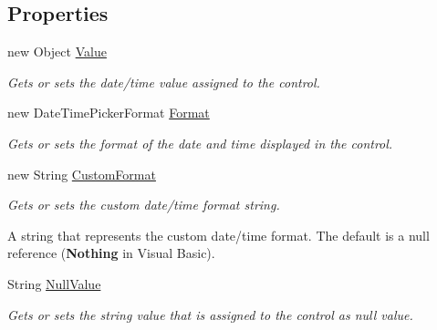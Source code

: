 \subsection*{Properties}
\begin{DoxyCompactItemize}
\item 
new Object \hyperlink{class_products_1_1_u_i_1_1_controls_1_1_nullable_date_time_picker_a9091a86904f5dc84062fcef8e57cc28b}{Value}
\begin{DoxyCompactList}\small\item\em Gets or sets the date/time value assigned to the control. \end{DoxyCompactList}\item 
new Date\+Time\+Picker\+Format \hyperlink{class_products_1_1_u_i_1_1_controls_1_1_nullable_date_time_picker_ab32d444a5ca3ff9a9b63e08394755095}{Format}
\begin{DoxyCompactList}\small\item\em Gets or sets the format of the date and time displayed in the control. \end{DoxyCompactList}\item 
new String \hyperlink{class_products_1_1_u_i_1_1_controls_1_1_nullable_date_time_picker_ac69a112261a61aa43137940e04dbe768}{Custom\+Format}
\begin{DoxyCompactList}\small\item\em Gets or sets the custom date/time format string. 

A string that represents the custom date/time format. The default is a null reference ({\bfseries Nothing} in Visual Basic).\end{DoxyCompactList}\item 
String \hyperlink{class_products_1_1_u_i_1_1_controls_1_1_nullable_date_time_picker_af74f08ca7e55f46e32b31e053c733157}{Null\+Value}
\begin{DoxyCompactList}\small\item\em Gets or sets the string value that is assigned to the control as null value. \end{DoxyCompactList}\end{DoxyCompactItemize}


